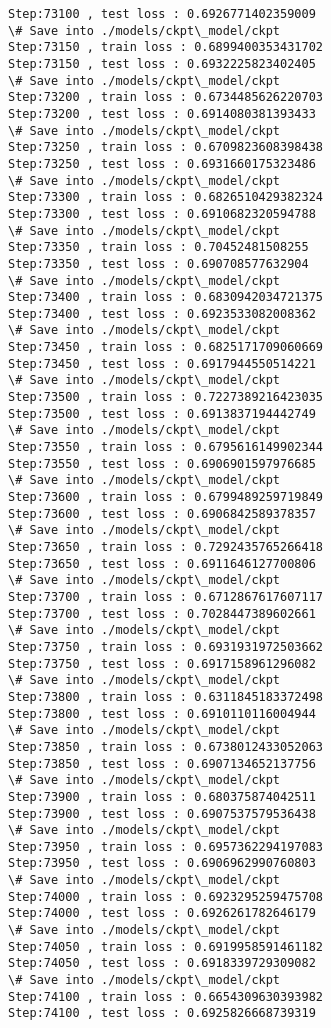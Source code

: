\documentclass[11pt]{article}
\begin{document}
\begin{Verbatim}[commandchars=\\\{\}]
Step:73100 , test loss : 0.6926771402359009
\# Save into ./models/ckpt\_model/ckpt
Step:73150 , train loss : 0.6899400353431702
Step:73150 , test loss : 0.6932225823402405
\# Save into ./models/ckpt\_model/ckpt
Step:73200 , train loss : 0.6734485626220703
Step:73200 , test loss : 0.6914080381393433
\# Save into ./models/ckpt\_model/ckpt
Step:73250 , train loss : 0.6709823608398438
Step:73250 , test loss : 0.6931660175323486
\# Save into ./models/ckpt\_model/ckpt
Step:73300 , train loss : 0.6826510429382324
Step:73300 , test loss : 0.6910682320594788
\# Save into ./models/ckpt\_model/ckpt
Step:73350 , train loss : 0.70452481508255
Step:73350 , test loss : 0.690708577632904
\# Save into ./models/ckpt\_model/ckpt
Step:73400 , train loss : 0.6830942034721375
Step:73400 , test loss : 0.6923533082008362
\# Save into ./models/ckpt\_model/ckpt
Step:73450 , train loss : 0.6825171709060669
Step:73450 , test loss : 0.6917944550514221
\# Save into ./models/ckpt\_model/ckpt
Step:73500 , train loss : 0.7227389216423035
Step:73500 , test loss : 0.6913837194442749
\# Save into ./models/ckpt\_model/ckpt
Step:73550 , train loss : 0.6795616149902344
Step:73550 , test loss : 0.6906901597976685
\# Save into ./models/ckpt\_model/ckpt
Step:73600 , train loss : 0.6799489259719849
Step:73600 , test loss : 0.6906842589378357
\# Save into ./models/ckpt\_model/ckpt
Step:73650 , train loss : 0.7292435765266418
Step:73650 , test loss : 0.6911646127700806
\# Save into ./models/ckpt\_model/ckpt
Step:73700 , train loss : 0.6712867617607117
Step:73700 , test loss : 0.7028447389602661
\# Save into ./models/ckpt\_model/ckpt
Step:73750 , train loss : 0.6931931972503662
Step:73750 , test loss : 0.6917158961296082
\# Save into ./models/ckpt\_model/ckpt
Step:73800 , train loss : 0.6311845183372498
Step:73800 , test loss : 0.6910110116004944
\# Save into ./models/ckpt\_model/ckpt
Step:73850 , train loss : 0.6738012433052063
Step:73850 , test loss : 0.6907134652137756
\# Save into ./models/ckpt\_model/ckpt
Step:73900 , train loss : 0.680375874042511
Step:73900 , test loss : 0.6907537579536438
\# Save into ./models/ckpt\_model/ckpt
Step:73950 , train loss : 0.6957362294197083
Step:73950 , test loss : 0.6906962990760803
\# Save into ./models/ckpt\_model/ckpt
Step:74000 , train loss : 0.6923295259475708
Step:74000 , test loss : 0.6926261782646179
\# Save into ./models/ckpt\_model/ckpt
Step:74050 , train loss : 0.6919958591461182
Step:74050 , test loss : 0.6918339729309082
\# Save into ./models/ckpt\_model/ckpt
Step:74100 , train loss : 0.6654309630393982
Step:74100 , test loss : 0.6925826668739319

\end{Verbatim}
\end{document}
